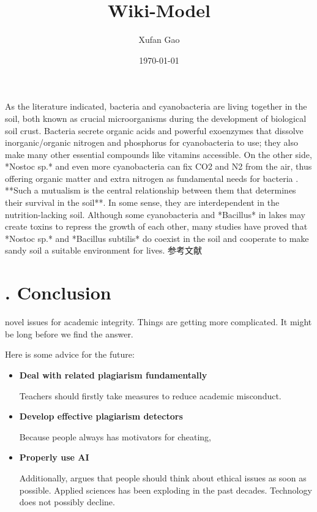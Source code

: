 \documentclass[UTF8,12pt,a4paper,doc,natbib,apacite]{apa6}
\title{Wiki-Model}
\author{Xufan Gao}
\date{\today}
\begin{document}
\maketitle

As the literature indicated, bacteria and cyanobacteria are living together in the soil, both known as crucial microorganisms during the development of biological soil crust. Bacteria secrete organic acids and powerful exoenzymes that dissolve inorganic/organic nitrogen and phosphorus for cyanobacteria to use; they also make many other essential compounds like vitamins accessible. On the other side, *Nostoc sp.* and even more cyanobacteria can fix CO2 and N2 from the air, thus offering organic matter and extra nitrogen as fundamental needs for bacteria \citep{Chen2020}.  **Such a mutualism is the central relationship between them that determines their survival in the soil**. In some sense, they are interdependent in the nutrition-lacking soil. Although some cyanobacteria and *Bacillus* in lakes may create toxins to repress the growth of each other, many studies have proved that *Nostoc sp.* and *Bacillus subtilis* do coexist in the soil and cooperate to make sandy soil a suitable environment for lives. 参考文献







\section{. Conclusion}
novel issues for academic integrity. Things are getting more complicated. It might be long before we find the answer.

Here is some advice for the future:

\begin{itemize}
	\item \textbf{Deal with related plagiarism fundamentally}
	
	Teachers should firstly take measures to reduce academic misconduct. \cite{3} 
	
	\item \textbf{Develop effective plagiarism detectors}
	
	Because people always has motivators for cheating, 
	
	\item \textbf{Properly use AI}
	
	Additionally, \cite{5} argues that people should think about ethical issues as soon as possible. Applied sciences has been exploding in the past decades. Technology does not possibly decline.  

\end{itemize}


\renewcommand{\refname}{\bfseries REFERENCES}




\end{document}
